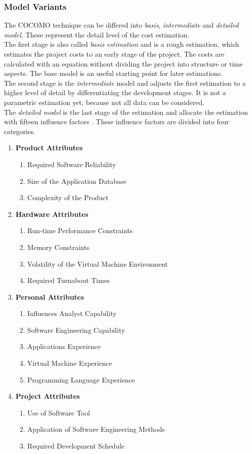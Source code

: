 \subsubsection{Model Variants}

The COCOMO technique can be differed into \textit{basis}, \textit{intermediate} and \textit{detailed model}. These represent the detail level of the cost estimation.\\
The first stage is also called \textit{basis estimation} and is a rough estimation, which estimates the project costs to an early stage of the project. The costs are calculated with an equation without dividing the project into structure or time aspects. The base model is an useful starting point for later estimations.\\
The second stage is the \textit{intermediate} model and adjusts the first estimation to a higher level of detail by differentiating the development stages. It is not a parametric estimation yet, because not all data can be considered.\\
The \textit{detailed model} is the last stage of the estimation and allocate the estimation with fifteen influence factors \cite{jenny}. These influence factors are divided into four categories.
\begin{enumerate}
	\item \textbf{Product Attributes}
	\begin{enumerate}
		\item Required Software Reliability
		\item Size of the Application Database
		\item Complexity of the Product
	\end{enumerate}
	\item \textbf{Hardware Attributes}
	\begin{enumerate}
		\item Run-time Performance Constraints
		\item Memory Constraints
		\item Volatility of the Virtual Machine Environment 
		\item Required Turnabout Times
	\end{enumerate}
	\item \textbf{Personal Attributes}
	\begin{enumerate}
		\item Influences Analyst Capability
		\item Software Engineering Capability
		\item Applications Experience
		\item Virtual Machine Experience
		\item Programming Language Experience
	\end{enumerate}
	\item \textbf{Project Attributes}
	\begin{enumerate}
		\item Use of Software Tool
		\item Application of Software Engineering Methods
		\item Required Development Schedule
	\end{enumerate}
\end{enumerate}


